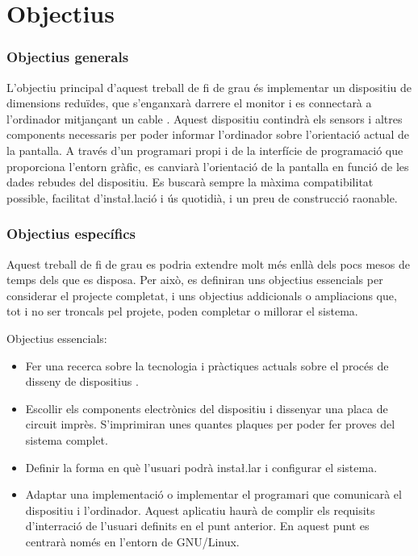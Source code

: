 \chapter{Objectius}
\label{cap:objectius}

\subsection{Objectius generals}

L'objectiu principal d'aquest treball de fi de grau és implementar un dispositiu
de dimensions reduïdes, que s'enganxarà darrere el monitor i es connectarà
a l'ordinador mitjançant un cable . Aquest dispositiu contindrà els
sensors i altres components necessaris per poder informar l'ordinador sobre
l'orientació actual de la pantalla. A través d'un programari propi i de la
interfície de programació que proporciona l'entorn gràfic, es canviarà
l'orientació de la pantalla en funció de les dades rebudes del dispositiu. Es
buscarà sempre la màxima compatibilitat possible, facilitat d'insta\l.lació i
ús quotidià, i un preu de construcció raonable.


\subsection{Objectius específics}

Aquest treball de fi de grau es podria extendre molt més enllà dels pocs mesos
de temps dels que es disposa. Per això, es definiran uns objectius essencials
per considerar el projecte completat, i uns objectius addicionals o
ampliacions que, tot i no ser troncals pel projete, poden completar o
millorar el sistema.

Objectius essencials:
\begin{itemize}
    \item Fer una recerca sobre la tecnologia i pràctiques actuals sobre el 
    procés de disseny de dispositius .
    \item Escollir els components electrònics del dispositiu i dissenyar una
    placa de circuit imprès. S'imprimiran unes quantes plaques per poder fer
    proves del sistema complet.
    \item Definir la forma en què l'usuari podrà insta\l.lar i configurar
    el sistema.
    \item Adaptar una implementació o implementar el programari que comunicarà
    el dispositiu i l'ordinador. Aquest aplicatiu haurà de complir els
    requisits d'interració de l'usuari definits en el punt anterior. En aquest
    punt es centrarà només en l'entorn de GNU/Linux.
\end{itemize}

